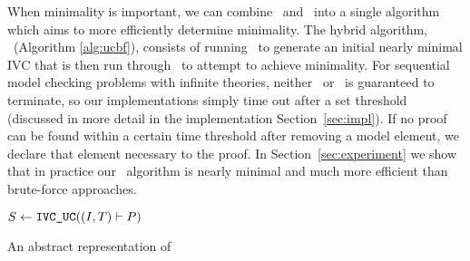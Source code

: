 When minimality is important, we can combine \bfalg\ and \ucalg\ into
a single algorithm which aims to more efficiently determine minimality.  The
hybrid algorithm, \ucbfalg\ (Algorithm \ref{alg:ucbf}), consists of running \ucalg\ to generate an initial nearly minimal IVC that is then run through \bfalg\ to
attempt to achieve minimality.   For sequential model checking problems with infinite theories, neither \bfalg\ or \ucbfalg\ is guaranteed to terminate, so our implementations simply time out after a set threshold (discussed in more detail in the implementation Section~\ref{sec:impl}).  If no proof can be found within a certain time threshold after removing a model element, we declare that element necessary to the proof. In Section~\ref{sec:experiment} we show that in practice our \ucalg\ algorithm is nearly
minimal and much more efficient than brute-force approaches.

\begin{algorithm}
  \BlankLine
  $S \leftarrow \ucalg((I, T) \vdash P)$ \\
   {
  }
\caption{An abstract representation of \ucbfalg }
\label{alg:ucbf}
\end{algorithm}



